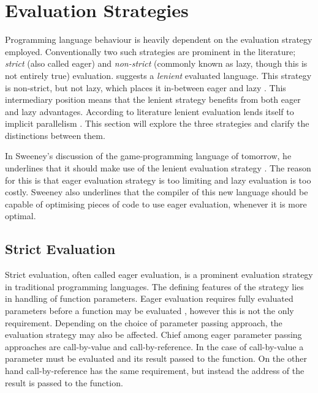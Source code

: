 \section{Evaluation Strategies}
Programming language behaviour is heavily dependent on the evaluation strategy employed. Conventionally two such strategies are prominent in the literature\cite{DBLP:journals/cl/Tremblay-lenient}; \textit{strict} (also called eager) and \textit{non-strict} (commonly known as lazy, though this is not entirely true) evaluation. \cite{DBLP:journals/cl/Tremblay-lenient} suggests a \textit{lenient} evaluated language. This strategy is non-strict, but not lazy, which places it in-between eager and lazy \cite{DBLP:journals/cl/Tremblay-lenient}. This intermediary position means that the lenient strategy benefits from both eager and lazy advantages. According to literature lenient evaluation lends itself to implicit parallelism \cite{DBLP:journals/cl/Tremblay-parallel}. This section will explore the three strategies and clarify the distinctions between them.

In Sweeney's discussion of the game-programming language of tomorrow, he underlines that it should make use of the lenient evaluation strategy \cite{theNextMainstreanProgrammingLanguage}. The reason for this is that eager evaluation strategy is too limiting and lazy evaluation is too costly. Sweeney also underlines that the compiler of this new language should be capable of optimising pieces of code to use eager evaluation, whenever it is more optimal.

\subsection{Strict Evaluation}
Strict evaluation, often called eager evaluation, is a prominent evaluation strategy in traditional programming languages. The defining features of the strategy lies in handling of function parameters. Eager evaluation requires fully evaluated parameters before a function may be evaluated \cite[p.~103]{huttel2010transitions}, however this is not the only requirement. Depending on the choice of parameter passing approach, the evaluation strategy may also be affected. Chief among eager parameter passing approaches are call-by-value and call-by-reference. In the case of call-by-value a parameter must be evaluated and its result passed to the function. On the other hand call-by-reference has the same requirement, but instead the address of the result is passed to the function.

